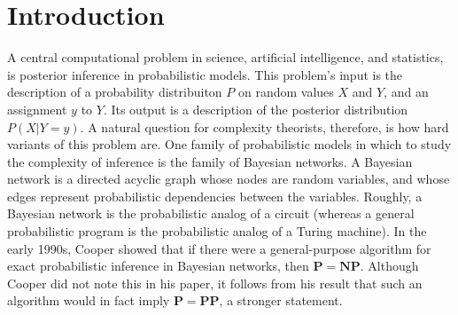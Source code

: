 \documentclass{article}
\renewcommand{\P}{\mathbf{P}}
\newcommand{\NP}{\mathbf{NP}}
\def \PP{\P\P}
\theoremstyle{definition}
\theoremstyle{remark}
\begin{document}
\section{Introduction}
A central computational problem in science, artificial intelligence, and statistics, is posterior inference in probabilistic models.
This problem's input is the description of a probability distribuiton $P$ on random values $X$ and $Y$, and an assignment $y$ to $Y$.
Its output is a description of the posterior distribution $P(X | Y = y)$.
A natural question for complexity theorists, therefore, is how hard variants of this problem are.
One family of probabilistic models in which to study the complexity of inference is the family of Bayesian networks.
A Bayesian network is a directed acyclic graph whose nodes are random variables, and whose edges represent probabilistic dependencies between the variables.
Roughly, a Bayesian network is the probabilistic analog of a circuit (whereas a general probabilistic program \cite{mansinghka2009natively} is the probabilistic analog of a Turing machine).
In the early 1990s, Cooper \cite{cooper1990} showed that if there were a general-purpose algorithm for exact probabilistic inference in Bayesian networks, then $\P = \NP$.
Although Cooper did not note this in his paper, it follows from his result that such an algorithm would in fact imply $\P = \PP$, a stronger statement.
\end{document}
